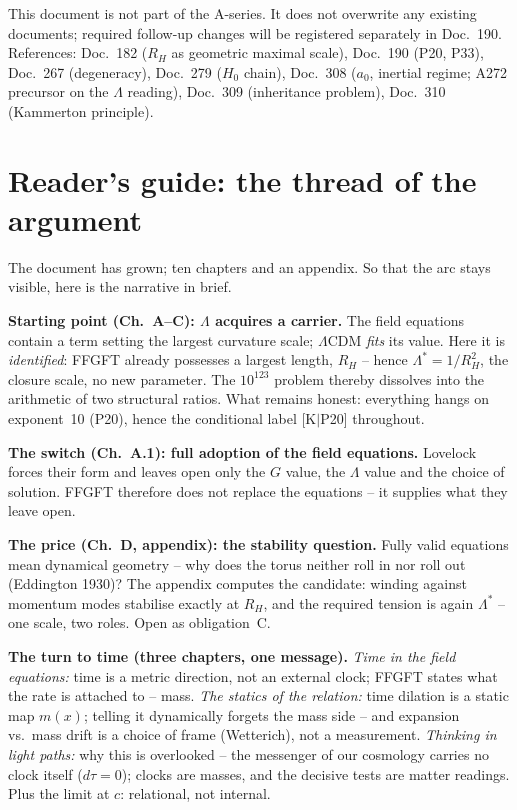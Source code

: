 This document is not part of the A-series. It does not overwrite any
existing documents; required follow-up changes will be registered
separately in Doc.~190.
References: Doc.~182 ($R_H$ as geometric maximal scale),
Doc.~190 (P20, P33), Doc.~267 (degeneracy), Doc.~279 ($H_0$ chain),
Doc.~308 ($a_0$, inertial regime; A272 precursor on the $\Lambda$
reading), Doc.~309 (inheritance problem), Doc.~310 (Kammerton
principle).

\section*{Reader's guide: the thread of the argument}

The document has grown; ten chapters and an appendix. So that the
arc stays visible, here is the narrative in brief.

\textbf{Starting point (Ch.~A--C): $\Lambda$ acquires a carrier.}
The field equations contain a term setting the largest curvature
scale; $\Lambda$CDM \emph{fits} its value. Here it is
\emph{identified}: FFGFT already possesses a largest length, $R_H$
-- hence $\Lambda^{*} = 1/R_H^2$, the closure scale, no new
parameter. The $10^{123}$ problem thereby dissolves into the
arithmetic of two structural ratios. What remains honest:
everything hangs on exponent~10 (P20), hence the conditional label
[K$|$P20] throughout.

\textbf{The switch (Ch.~A.1): full adoption of the field
equations.} Lovelock forces their form and leaves open only the
$G$ value, the $\Lambda$ value and the choice of solution. FFGFT
therefore does not replace the equations -- it supplies what they
leave open.

\textbf{The price (Ch.~D, appendix): the stability question.}
Fully valid equations mean dynamical geometry -- why does the
torus neither roll in nor roll out (Eddington 1930)? The appendix
computes the candidate: winding against momentum modes stabilise
exactly at $R_H$, and the required tension is again $\Lambda^{*}$
-- one scale, two roles. Open as obligation~C.

\textbf{The turn to time (three chapters, one message).}
\emph{Time in the field equations:} time is a metric direction,
not an external clock; FFGFT states what the rate is attached to
-- mass. \emph{The statics of the relation:} time dilation is a
static map $m(x)$; telling it dynamically forgets the mass side --
and expansion vs.\ mass drift is a choice of frame (Wetterich),
not a measurement. \emph{Thinking in light paths:} why this is
overlooked -- the messenger of our cosmology carries no clock
itself ($d\tau = 0$); clocks are masses, and the decisive tests
are matter readings. Plus the limit at $c$: relational, not
internal.

